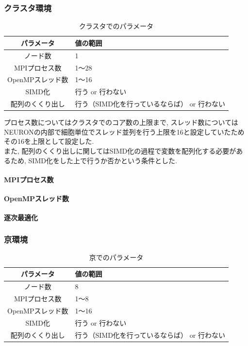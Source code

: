 \subsubsection{クラスタ環境}
\begin{table}[htb]
  \caption {クラスタでのパラメータ}
  \begin{center}
    \begin{tabular}{|c|p{12cm}|}
      \hline
      パラメータ & 値の範囲\\ \hline
      ノード数 & 1\\ \hline
      MPIプロセス数 & 1〜28\\ \hline
      OpenMPスレッド数 & 1〜16\\ \hline
      SIMD化 & 行う or 行わない\\ \hline
      配列のくくり出し & 行う（SIMD化を行っているならば） or 行わない\\ \hline
    \end{tabular}
  \end{center}
\end{table}
プロセス数についてはクラスタでのコア数の上限まで,
スレッド数についてはNEURONの内部で細胞単位でスレッド並列を行う上限を16と設定していたためその16を上限として設定した.\\
また, 配列のくくり出しに関してはSIMD化の過程で変数を配列化する必要があるため, SIMD化をした上で行うか否かという条件とした.\\

\paragraph{MPIプロセス数}

\paragraph{OpenMPスレッド数}

\paragraph{逐次最適化}



\clearpage
\subsubsection{京環境}
\begin{table}[htb]
  \caption {京でのパラメータ}
  \begin{center}
    \begin{tabular}{|c|p{12cm}|}
      \hline
      パラメータ & 値の範囲\\ \hline
      ノード数 & 8\\ \hline
      MPIプロセス数 & 1〜8\\ \hline
      OpenMPスレッド数 & 1〜16\\ \hline
      SIMD化 & 行う or 行わない\\ \hline
      配列のくくり出し & 行う（SIMD化を行っているならば） or 行わない\\ \hline
    \end{tabular}
  \end{center}
\end{table}

